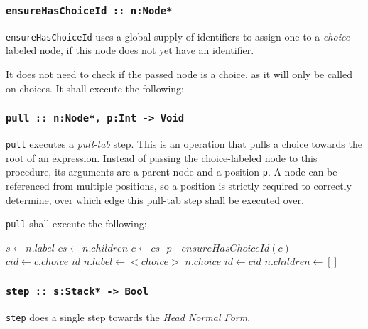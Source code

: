 \subsubsection{\texttt{ensureHasChoiceId ::~n:Node*}}

\texttt{ensureHasChoiceId} uses a global supply of identifiers to assign one to a \emph{choice}-labeled node, if this node does not yet have an identifier.

\noindent
It does not need to check if the passed node is a choice, as it will only be called on choices.
It shall execute the following:

\begin{algorithm}[H]
\end{algorithm}

\subsubsection{\texttt{pull ::~n:Node*, p:Int -> Void}}
\label{pull}

\texttt{pull} executes a \emph{pull-tab} step.
This is an operation that pulls a choice towards the root of an expression.
Instead of passing the choice-labeled node to this procedure, its arguments are a parent node and a position \texttt{p}.
A node can be referenced from multiple positions, so a position is strictly required to correctly determine, over which edge this pull-tab step shall be executed over.

\noindent
\texttt{pull} shall execute the following:

\begin{algorithm}[H]
$s \gets n.label$\;
$cs \gets n.children$\;
$c \gets cs[p]$\;
$ensureHasChoiceId(c)$\;
$cid \gets c.choice\_id$\;
$n.label \gets {<}choice{>}$\;
$n.choice\_id \gets cid$\;
$n.children \gets []$\;
\end{algorithm}

\subsubsection{\texttt{step ::~s:Stack* -> Bool}}
\label{step}

\texttt{step} does a single step towards the \emph{Head Normal Form}.

